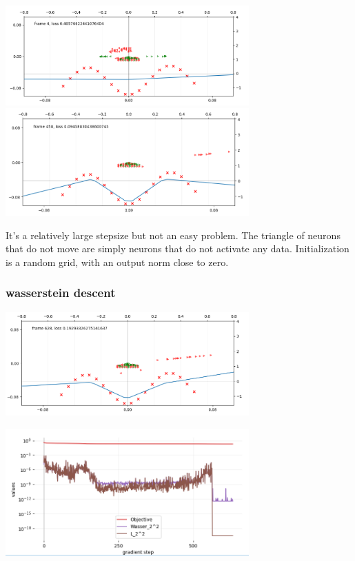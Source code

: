 \includegraphics[width=0.7\textwidth]{imgs/tau10_plot_start.png}
\includegraphics[width=0.7\textwidth]{imgs/tau10_plot_end.png}

It's a relatively large stepsize but not an easy problem. The triangle of neurons that do not move are simply neurons that do not activate any data. Initialization is a random grid, with an output norm close to zero.

\subsubsection{wasserstein descent}

\includegraphics[width=0.7\textwidth]{imgs/tau10_plot_wasser_end.png}

\includegraphics[width=0.7\textwidth]{imgs/tau10_graph_wasser.png}

